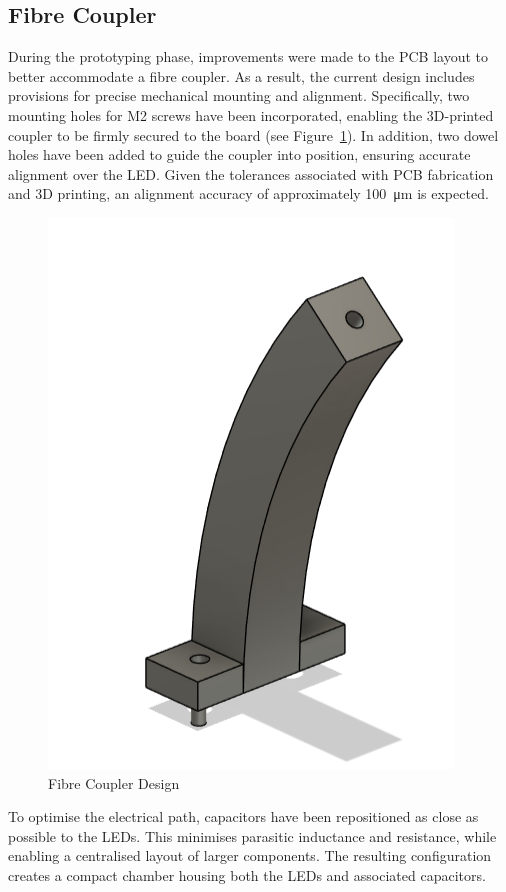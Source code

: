 \documentclass[a4paper,11pt]{article}
\begin{document}
\subsection{Fibre Coupler}

During the prototyping phase, improvements were made to the PCB layout to better accommodate a fibre coupler. As a result, the current design includes provisions for precise mechanical mounting and alignment. Specifically, two mounting holes for M2 screws have been incorporated, enabling the 3D-printed coupler to be firmly secured to the board (see Figure~\ref{fig:OldFibreCouplerDesign}). In addition, two dowel holes have been added to guide the coupler into position, ensuring accurate alignment over the LED. Given the tolerances associated with PCB fabrication and 3D printing, an alignment accuracy of approximately \SI{100}{\micro\metre} is expected.

\begin{figure}[htbp]
\centering
\includegraphics[scale=0.5]{OldFibreCouplerDesign.png}
\caption{Fibre Coupler Design\label{fig:OldFibreCouplerDesign}}
\end{figure}

To optimise the electrical path, capacitors have been repositioned as close as possible to the LEDs. This minimises parasitic inductance and resistance, while enabling a centralised layout of larger components. The resulting configuration creates a compact chamber housing both the LEDs and associated capacitors.
\end{document}
